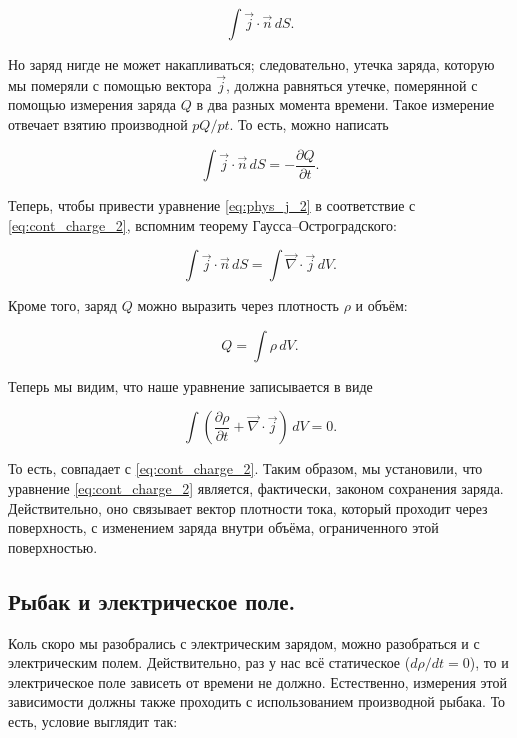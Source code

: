\documentclass[a4paper,12pt]{article}
\numberwithin{equation}{section}
\newcommand{\pt}{\partial}
\newcommand{\vn}{\vec{\nabla}}
\begin{document}
\begin{equation}
  \label{eq:phys_j_1}
  \int \vec{j} \cdot \vec{n}\, dS. 
\end{equation}

Но заряд нигде не может накапливаться; следовательно, утечка заряда,
которую мы померяли с помощью вектора $\vec{j}$, должна равняться
утечке, померянной с помощью измерения заряда $Q$ в два разных момента
времени. Такое измерение отвечает взятию производной $pQ/pt$. То есть,
можно написать

\begin{equation}
  \label{eq:phys_j_2}
  \int \vec{j} \cdot \vec{n}\, dS = -\frac{\pt Q}{\pt t}.  
\end{equation}

Теперь, чтобы привести уравнение \eqref{eq:phys_j_2} в соответствие с
\eqref{eq:cont_charge_2}, вспомним теорему Гаусса--Остроградского: 

\begin{equation}
  \label{eq:phys_j_3}
   \int \vec{j} \cdot \vec{n}\, dS = \int \vn \cdot \vec{j}\, dV.
\end{equation}

Кроме того, заряд $Q$ можно выразить через плотность $\rho$ и объём: 

\begin{equation}
  \label{eq:phys_j_4}
  Q = \int \rho \, dV.
\end{equation}

Теперь мы видим, что наше уравнение записывается в виде 

\begin{equation}
  \label{eq:phys_j_5}
  \int \left( \frac{\pt \rho}{\pt t} + \vn \cdot \vec{j}  \right)\, dV
  = 0.
\end{equation}

То есть, совпадает с \eqref{eq:cont_charge_2}. Таким образом, мы
установили, что уравнение \eqref{eq:cont_charge_2} является,
фактически, законом сохранения заряда. Действительно, оно связывает
вектор плотности тока, который проходит через поверхность, с
изменением заряда внутри объёма, ограниченного этой поверхностью.

\subsection{Рыбак и электрическое поле.}
\label{sec:maxwell_eq_4}

Коль скоро мы разобрались с электрическим зарядом, можно разобраться и
с электрическим полем. Действительно, раз у нас всё статическое ($d\rho
/dt=0$), то и электрическое поле зависеть от времени не
должно. Естественно, измерения этой зависимости должны также проходить
с использованием производной рыбака. То есть, условие выглядит так: 
\end{document}
